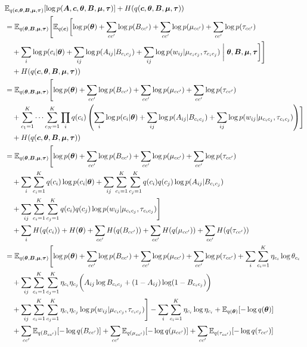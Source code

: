 \documentclass{article}
\renewcommand{\v}[1]{\bm{#1}}
\newcommand{\E}{\mathbb{E}}
\begin{document}
\begin{equation}
\begin{aligned}
& \E_{q(\v{c}, \v{\theta}, \v{B}, \v{\mu}, \v{\tau})}[\log p(\v{A}, \v{c}, \v{\theta}, \v{B}, \v{\mu}, \v{\tau})] + H(q(\v{c}, \v{\theta}, \v{B}, \v{\mu}, \v{\tau})) \\ 
&= \E_{q(\v{\theta}, \v{B}, \v{\mu}, \v{\tau})} \Biggl[ \E_{q(\v{c})} \biggl[ \log p(\v{\theta}) + \sum_{cc'} \log p(B_{cc'}) + \sum_{cc'} \log p(\mu_{cc'}) + \sum_{cc'} \log p(\tau_{cc'})\\
& \quad + \sum_i \log p(c_i | \v{\theta}) + \sum_{ij} \log p(A_{ij} | B_{c_ic_j}) + \sum_{ij} \log p(w_{ij} | \mu_{c_ic_j}, \tau_{c_ic_j}) \biggm\vert \v{\theta}, \v{B}, \v{\mu}, \v{\tau} \biggr] \Biggr]\\ 
& \quad + H(q(\v{c}, \v{\theta}, \v{B}, \v{\mu}, \v{\tau})) \\
&= \E_{q(\v{\theta}, \v{B}, \v{\mu}, \v{\tau})}\Biggl[ \log p(\v{\theta}) + \sum_{cc'} \log p(B_{cc'}) + \sum_{cc'} \log p(\mu_{cc'}) + \sum_{cc'} \log p(\tau_{cc'})\\
& \quad + \sum_{c_1=1}^K \cdots \sum_{c_N=1}^K \prod_i q(c_i) \left( \sum_i \log p(c_i | \v{\theta}) + \sum_{ij} \log p(A_{ij} | B_{c_ic_j}) + \sum_{ij} \log p(w_{ij} | \mu_{c_ic_j}, \tau_{c_ic_j})\right) \Biggr]\\ 
& \quad + H(q(\v{c}, \v{\theta}, \v{B}, \v{\mu}, \v{\tau})) \\
&= \E_{q(\v{\theta}, \v{B}, \v{\mu}, \v{\tau})}\Biggl[ \log p(\v{\theta}) + \sum_{cc'} \log p(B_{cc'}) + \sum_{cc'} \log p(\mu_{cc'}) + \sum_{cc'} \log p(\tau_{cc'})\\
& \quad + \sum_i \sum_{c_i=1}^K q(c_i) \log p(c_i | \v{\theta}) + \sum_{ij} \sum_{c_i=1}^K \sum_{c_j=1}^K q(c_i) q(c_j) \log p(A_{ij} | B_{c_ic_j})\\
& \quad + \sum_{ij} \sum_{c_i=1}^K \sum_{c_j=1}^K q(c_i) q(c_j) \log p(w_{ij} | \mu_{c_ic_j}, \tau_{c_ic_j})\Biggr]\\
& \quad + \sum_i H(q(c_i)) + H(\v{\theta}) + \sum_{cc'} H(q(B_{cc'})) + \sum_{cc'} H(q(\mu_{cc'})) + \sum_{cc'} H(q(\tau_{cc'})) \\
&= \E_{q(\v{\theta}, \v{B}, \v{\mu}, \v{\tau})}\Biggl[ \log p(\v{\theta}) + \sum_{cc'} \log p(B_{cc'}) + \sum_{cc'} \log p(\mu_{cc'}) + \sum_{cc'} \log p(\tau_{cc'})+ \sum_i \sum_{c_i=1}^K \eta_{c_i} \log \theta_{c_i}\\ 
& \quad + \sum_{ij} \sum_{c_i=1}^K \sum_{c_j=1}^K \eta_{c_i} \eta_{c_j} \biggl( A_{ij} \log B_{c_ic_j} + (1 - A_{ij}) \log (1 - B_{c_ic_j})\biggr)  \\
& \quad + \sum_{ij} \sum_{c_i=1}^K \sum_{c_j=1}^K \eta_{c_i} \eta_{c_j} \log p(w_{ij} | \mu_{c_ic_j}, \tau_{c_ic_j}) \Biggr] - \sum_i \sum_{c_i=1}^K \eta_{c_i} \log \eta_{c_i} + \E_{q(\v{\theta})}[- \log q(\v{\theta})]\\
& \quad + \sum_{cc'} \E_{q(B_{cc'})}[- \log q(B_{cc'})] + \sum_{cc'} \E_{q(\mu_{cc'})}[- \log q(\mu_{cc'})] + \sum_{cc'} \E_{q(\tau_{cc'})}[- \log q(\tau_{cc'})]\\
\end{aligned}
\end{equation}
\end{document}
